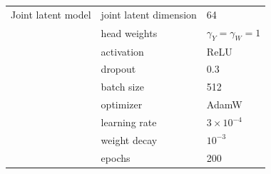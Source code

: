 \begin{table}[htbp]
\begin{tabular}{lll}
Joint latent model
& joint latent dimension & 64 \\
& head weights & \(\gamma_Y=\gamma_W=1\) \\
& activation & ReLU \\
& dropout & 0.3 \\
& batch size & 512 \\
& optimizer & AdamW \\
& learning rate & \(3\times10^{-4}\) \\
& weight decay & \(10^{-3}\) \\
& epochs & 200 \\
\hline
\end{tabular}
\end{table}
\FloatBarrier

